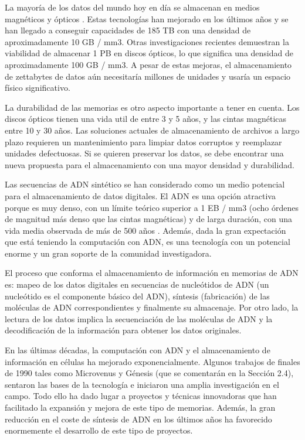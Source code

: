 \documentclass[a4paper,11pt]{article}
\begin{document}
La mayoría de los datos del mundo hoy en día se almacenan en medios magnéticos y ópticos \citep{IDC}. Estas tecnologías han mejorado en los últimos años y se han llegado a conseguir capacidades de 185 TB \citep{Sony} con una densidad de aproximadamente 10 GB / mm3. Otras investigaciones recientes demuestran la viabilidad de almacenar 1 PB \citep{ExtremeTech} en discos ópticos, lo que significa una densidad de aproximadamente 100 GB / mm3. A pesar de estas mejoras, el almacenamiento de zettabytes de datos aún necesitaría millones de unidades y usaría un espacio físico significativo. 

La durabilidad de las memorias es otro aspecto importante a tener en cuenta. Los discos ópticos tienen una vida util de entre 3 y 5 años, y las cintas magnéticas entre 10 y 30 años. Las soluciones actuales de almacenamiento de archivos a largo plazo requieren un mantenimiento para limpiar datos corruptos y reemplazar unidades defectuosas. Si se quieren preservar los datos, se debe encontrar una nueva propuesta para el almacenamiento con una mayor densidad y durabilidad.

Las secuencias de ADN sintético se han considerado como un medio potencial para el almacenamiento de datos digitales. El ADN es una opción atractiva porque es muy denso, con un límite teórico superior a 1 EB / mm3 (ocho órdenes de magnitud más denso que las cintas magnéticas) y de larga duración, con una vida media observada de más de 500 años \citep{Allentoft2012}. Además, dada la gran expectación que está teniendo la computación con ADN, es una tecnología con un potencial enorme y un gran soporte de la comunidad investigadora. 

El proceso que conforma el almacenamiento de información en memorias de ADN es: mapeo de los datos digitales en secuencias de nucleótidos de ADN (un nucleótido es el componente básico del ADN), síntesis (fabricación) de las moléculas de ADN correspondientes y finalmente su almacenaje. Por otro lado, la lectura de los datos implica la secuenciación de las moléculas de ADN y la decodificación de la información para obtener los datos originales. 

En las últimas décadas, la computación con ADN y el almacenamiento de información en células ha mejorado exponencialmente. Algunos trabajos de finales de 1990 tales como Microvenus \citep{JoeDavis1996}  y Génesis \citep{EK1999} (que se comentarán  en la Sección 2.4), sentaron las bases de la tecnología e iniciaron una amplia investigación en el campo. Todo ello ha dado lugar a proyectos y técnicas innovadoras \citep{Goldman2013} \citep{Quadri2004} que han facilitado la expansión y mejora de este tipo de memorias. Además, la gran reducción en el coste de síntesis de ADN en los últimos años ha favorecido enormemente el desarrollo de este tipo de proyectos.
\end{document}
